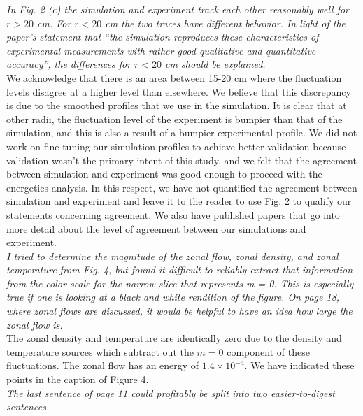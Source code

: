 \documentclass[12pt]{article}
\begin{document}
{\noindent \itshape In Fig. 2 (c) the simulation and experiment track each other reasonably well for $r > 20$
cm. For $r < 20$ cm the two traces have different behavior. In light of the paper’s
statement that “the simulation reproduces these characteristics of experimental
measurements with rather good qualitative and quantitative accuracy”, the differences for
$r < 20$ cm should be explained. }\\

{\noindent We acknowledge that there is an area between 15-20 cm where the fluctuation levels disagree at a higher level than elsewhere. We believe that this discrepancy is due to the smoothed
profiles that we use in the simulation. It is clear that at other radii, the fluctuation level of the experiment is bumpier than that of the simulation, and this is also a result
of a bumpier experimental profile. We did not work on fine tuning our simulation profiles to achieve better validation because validation wasn't the primary intent of this study,
and we felt that the agreement between simulation and experiment was good enough to proceed with the energetics analysis. In this respect, we have not quantified the agreement between 
simulation and experiment and leave it to the reader to use Fig. 2 to qualify our statements concerning agreement. We also have published papers that go into more detail about the level
of agreement between our simulations and experiment. }\\

{\noindent \itshape   I tried to determine the magnitude of the zonal flow, zonal density, and zonal
temperature from Fig. 4, but found it difficult to reliably extract that information from the
color scale for the narrow slice that represents m = 0. This is especially true if one is
looking at a black and white rendition of the figure. On page 18, where zonal flows are
discussed, it would be helpful to have an idea how large the zonal flow is. }\\

{\noindent The zonal density and temperature are identically zero due to the density and temperature sources which subtract out the $m=0$ component of these fluctuations. The zonal flow has an energy
of $1.4 \times 10^{-4}$. We have indicated these points in the caption of Figure 4. }\\

{\noindent \itshape   The last sentence of page 11 could profitably be split into two easier-to-digest sentences. }\\
\end{document}
